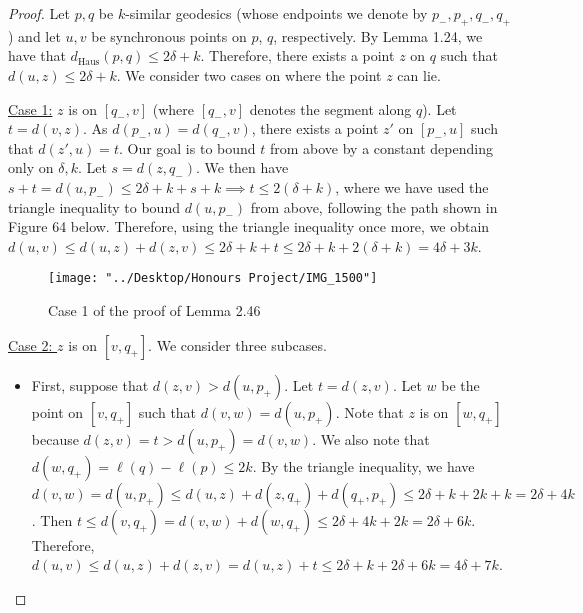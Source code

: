 \documentclass[12pt]{article}
\newcommand{\vs}{\vskip10pt}
\begin{document}
	\begin{proof}
		
		Let $p,q$ be $k$-similar geodesics (whose endpoints we denote by $p_{-}, p_{+}, q_{-}, q_{+}$) and let $u,v$ be synchronous points on $p$, $q$, respectively. By Lemma 1.24, we have that $d_{\text{Haus}}(p,q) \leq 2\delta + k$. Therefore, there exists a point $z$ on $q$ such that $d(u,z) \leq 2\delta + k$. We consider two cases on where the point $z$ can lie. 
		
		\vs 
		
		\underline{Case 1:} $z$ is on $[q_{-}, v]$ (where $[q_{-}, v]$ denotes the segment along $q$). Let $t = d(v,z)$. As $d(p_{-}, u) = d(q_{-}, v)$, there exists a point $z'$ on $[p_{-}, u]$ such that $d(z', u) = t$. Our goal is to bound $t$ from above by a constant depending only on $\delta, k$. Let $s = d(z, q_{-})$. We then have $s + t = d(u, p_{-}) \leq 2 \delta + k + s + k \implies t \leq 2(\delta + k)$, where we have used the triangle inequality to bound $d(u, p_{-})$ from above, following the path shown in Figure 64 below. Therefore, using the triangle inequality once more, we obtain $d(u,v) \leq d(u,z) + d(z,v) \leq 2\delta + k + t \leq 2\delta + k + 2(\delta + k) = 4\delta + 3k$. 
		
		
\begin{figure} [H]
	\centering
	\texttt{[image: "../Desktop/Honours Project/IMG\_1500"]}
	\caption{Case 1 of the proof of Lemma 2.46}
	\label{fig:img1500}
\end{figure}
		
		\vs 
		
		\underline{Case 2: } $z$ is on $[v, q_{+}]$. We consider three subcases. 
		
		\begin{itemize}
			\item First, suppose that $d(z, v) > d(u, p_{+})$. Let $t = d(z,v)$. Let $w$ be the point on $[v, q_{+}]$ such that $d(v, w) = d(u, p_{+})$. Note that $z$ is on $[w, q_{+}]$ because $d(z,v) = t > d(u, p_{+}) = d(v,w)$. We also note that $d(w, q_{+}) = \ell(q) - \ell(p) \leq 2k$. By the triangle inequality, we have $d(v,w) = d(u, p_{+}) \leq d(u, z) + d(z, q_{+}) + d(q_{+}, p_{+}) \leq 2 \delta + k + 2k + k = 2 \delta + 4k$. Then $t \leq d(v, q_{+}) = d(v,w) + d(w, q_{+}) \leq 2 \delta + 4k + 2k = 2 \delta + 6k$. Therefore, $d(u,v) \leq d(u,z) + d(z,v) = d(u,z) + t \leq 2 \delta + k + 2 \delta + 6k = 4 \delta + 7k$.
			

\end{itemize}
\end{proof}
\end{document}
